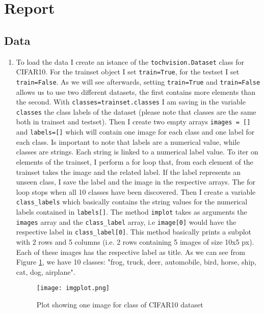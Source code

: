 \documentclass[a4paper]{article}
\begin{document}
\section*{Report}
\subsection{Data}
\begin{enumerate}
    \item To load the data I create an istance of the \texttt{tochvision.Dataset} class for CIFAR10. For the trainset object I set \texttt{train=True}, for the testset I set \texttt{train=False}. As we will see afterwards, setting \texttt{train=True} and \texttt{train=False} allows us to use two different datasets, the first contains more elements than the second. \newline With \texttt{classes=trainset.classes} I am saving in the variable \texttt{classes} the class labels of the dataset (please note that classes are the same both in trainset and testset). Then I create two empty arrays \texttt{images = []} and \texttt{labels=[]} which will contain one image for each class and one label for each class. Is important to note that labels are a numerical value, while classes are strings. Each string is linked to a numerical label value. \newline To iter on elements of the trainset, I perform a for loop that, from each element of the trainset takes the image and the related label. If the label represents an unseen class, I save the label and the image in the respective arrays. The for loop stops when all 10 classes have been discovered. \newline Then I create a variable \texttt{class\_labels} which basically contains the string values for the numerical labels contained in \texttt{labels[]}. \newline The method \texttt{implot} takes as arguments the \texttt{images} array and the \texttt{class\_label} array, i.e \texttt{image[0]} would have the respective label in \texttt{class\_label[0]}. This method basically prints a subplot with 2 rows and 5 columns (i.e. 2 rows containing 5 images of size 10x5 px). Each of these images has the respective label as title. As we can see from Figure \ref{fig:imgplot}, we have 10 classes: "frog, truck, deer, automobile, bird, horse, ship, cat, dog, airplane".

    \begin{figure}[h]
        \centering
        \texttt{[image: imgplot.png]}
        \caption{Plot showing one image for class of CIFAR10 dataset}
        \label{fig:imgplot}
    \end{figure}


\end{enumerate}
\end{document}
